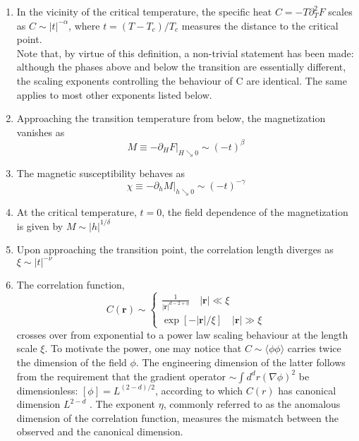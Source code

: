 \documentclass[cyan]{elegantnote}
\begin{document}
\begin{enumerate}
\item In the vicinity of the critical temperature, the specific heat $C = -T\partial_T^2 F$ scales as $C \sim |t|^{-\alpha}$, where $t = (T-T_c)/T_c$ measures the distance to the critical point. 
\\
Note that, by virtue of this definition, a non-trivial statement has been made: although the phases above and below the transition are essentially different, the scaling exponents controlling the behaviour of C are identical. The same applies to most other exponents listed below.
\item Approaching
the transition temperature from below, the magnetization vanishes as
\[M \equiv -\left. \partial_H F \right|_{H \searrow 0} \sim (-t)^{\beta} \]
\item The magnetic susceptibility behaves as
\[\chi \equiv -\left. \partial_h M \right|_{h \searrow 0} \sim (-t)^{-\gamma} \]
\item At the critical temperature, $t = 0$, the field dependence of the magnetization is given by $M \sim |h|^{1/\delta}$
\item Upon approaching the transition point, the correlation length diverges as $\xi \sim |t|^{-\nu}$
\item The correlation function,
\[C(\bm{r}) \sim \begin{cases} \frac{1}{|\bm{r}|^{d-2+\eta}} \quad |\bm{r}| \ll \xi \\ \exp[-|\bm{r}|/\xi] \quad |\bm{r}| \gg \xi  \end{cases} \]
crosses over from exponential to a power law scaling behaviour at the length scale $\xi$. 
To motivate the power, one may notice that $C \sim \langle \phi \phi \rangle$ carries twice the dimension of the field $\phi$. 
The engineering dimension of the latter follows from the requirement that the gradient operator $\sim \int d^dr (\nabla \phi)^2$ be dimensionless: $[\phi] = L^{(2-d)/2}$, according to which $C(r)$ has canonical dimension $L^{2-d}$ . 
The exponent $\eta$, commonly referred to as the anomalous dimension of the correlation function, measures the mismatch between the observed and the canonical dimension.
\end{enumerate}
\end{document}
